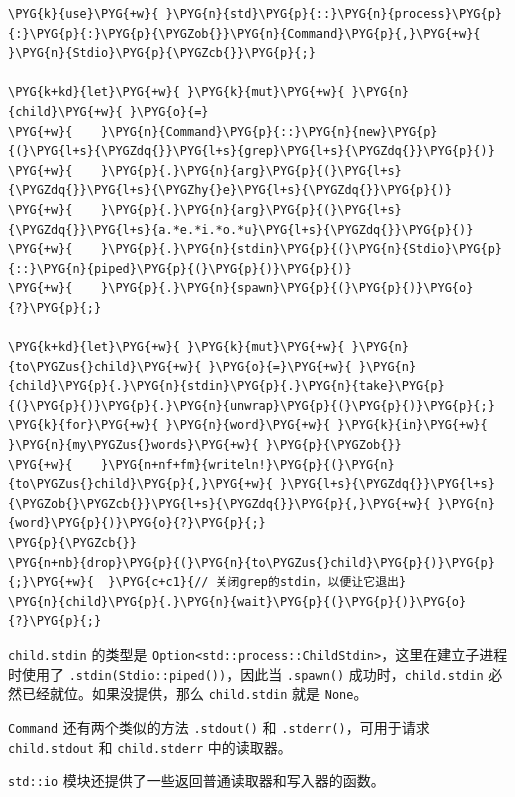 \begin{Verbatim}[commandchars=\\\{\},breaklines=true,breakanywhere=true,fontsize=\codefont,xleftmargin=17bp]
\PYG{k}{use}\PYG{+w}{ }\PYG{n}{std}\PYG{p}{::}\PYG{n}{process}\PYG{p}{:}\PYG{p}{:}\PYG{p}{\PYGZob{}}\PYG{n}{Command}\PYG{p}{,}\PYG{+w}{ }\PYG{n}{Stdio}\PYG{p}{\PYGZcb{}}\PYG{p}{;}

\PYG{k+kd}{let}\PYG{+w}{ }\PYG{k}{mut}\PYG{+w}{ }\PYG{n}{child}\PYG{+w}{ }\PYG{o}{=}
\PYG{+w}{    }\PYG{n}{Command}\PYG{p}{::}\PYG{n}{new}\PYG{p}{(}\PYG{l+s}{\PYGZdq{}}\PYG{l+s}{grep}\PYG{l+s}{\PYGZdq{}}\PYG{p}{)}
\PYG{+w}{    }\PYG{p}{.}\PYG{n}{arg}\PYG{p}{(}\PYG{l+s}{\PYGZdq{}}\PYG{l+s}{\PYGZhy{}e}\PYG{l+s}{\PYGZdq{}}\PYG{p}{)}
\PYG{+w}{    }\PYG{p}{.}\PYG{n}{arg}\PYG{p}{(}\PYG{l+s}{\PYGZdq{}}\PYG{l+s}{a.*e.*i.*o.*u}\PYG{l+s}{\PYGZdq{}}\PYG{p}{)}
\PYG{+w}{    }\PYG{p}{.}\PYG{n}{stdin}\PYG{p}{(}\PYG{n}{Stdio}\PYG{p}{::}\PYG{n}{piped}\PYG{p}{(}\PYG{p}{)}\PYG{p}{)}
\PYG{+w}{    }\PYG{p}{.}\PYG{n}{spawn}\PYG{p}{(}\PYG{p}{)}\PYG{o}{?}\PYG{p}{;}

\PYG{k+kd}{let}\PYG{+w}{ }\PYG{k}{mut}\PYG{+w}{ }\PYG{n}{to\PYGZus{}child}\PYG{+w}{ }\PYG{o}{=}\PYG{+w}{ }\PYG{n}{child}\PYG{p}{.}\PYG{n}{stdin}\PYG{p}{.}\PYG{n}{take}\PYG{p}{(}\PYG{p}{)}\PYG{p}{.}\PYG{n}{unwrap}\PYG{p}{(}\PYG{p}{)}\PYG{p}{;}
\PYG{k}{for}\PYG{+w}{ }\PYG{n}{word}\PYG{+w}{ }\PYG{k}{in}\PYG{+w}{ }\PYG{n}{my\PYGZus{}words}\PYG{+w}{ }\PYG{p}{\PYGZob{}}
\PYG{+w}{    }\PYG{n+nf+fm}{writeln!}\PYG{p}{(}\PYG{n}{to\PYGZus{}child}\PYG{p}{,}\PYG{+w}{ }\PYG{l+s}{\PYGZdq{}}\PYG{l+s}{\PYGZob{}\PYGZcb{}}\PYG{l+s}{\PYGZdq{}}\PYG{p}{,}\PYG{+w}{ }\PYG{n}{word}\PYG{p}{)}\PYG{o}{?}\PYG{p}{;}
\PYG{p}{\PYGZcb{}}
\PYG{n+nb}{drop}\PYG{p}{(}\PYG{n}{to\PYGZus{}child}\PYG{p}{)}\PYG{p}{;}\PYG{+w}{  }\PYG{c+c1}{// 关闭grep的stdin，以便让它退出}
\PYG{n}{child}\PYG{p}{.}\PYG{n}{wait}\PYG{p}{(}\PYG{p}{)}\PYG{o}{?}\PYG{p}{;}
\end{Verbatim}

\texttt{child.stdin} 的类型是 \texttt{Option<std::process::ChildStdin>}，这里在建立子进程时使用了 \texttt{.stdin(Stdio::piped())}，因此当 \texttt{.spawn()} 成功时，\texttt{child.stdin} 必然已经就位。如果没提供，那么 \texttt{child.stdin} 就是 \texttt{None}。

\texttt{Command} 还有两个类似的方法 \texttt{.stdout()} 和 \texttt{.stderr()}，可用于请求 \texttt{child.stdout} 和 \texttt{child.stderr} 中的读取器。

\texttt{std::io} 模块还提供了一些返回普通读取器和写入器的函数。

